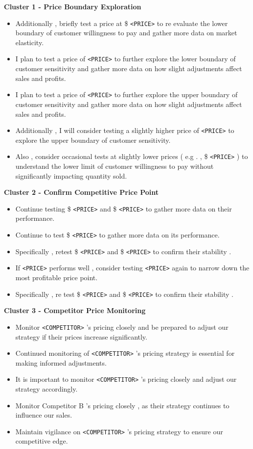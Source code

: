 \textbf{Cluster 1 - Price Boundary Exploration}
\begin{itemize}
    \item Additionally , briefly test a price at \$ \texttt{<PRICE>} to re evaluate the lower boundary of customer willingness to pay and gather more data on market elasticity.
    \item I plan to test a price of \texttt{<PRICE>} to further explore the lower boundary of customer sensitivity and gather more data on how slight adjustments affect sales and profits.
    \item I plan to test a price of \texttt{<PRICE>} to further explore the upper boundary of customer sensitivity and gather more data on how slight adjustments affect sales and profits.
    \item Additionally , I will consider testing a slightly higher price of \texttt{<PRICE>} to explore the upper boundary of customer sensitivity.
    \item Also , consider occasional tests at slightly lower prices ( e.g . , \$ \texttt{<PRICE>} ) to understand the lower limit of customer willingness to pay without significantly impacting quantity sold.
\end{itemize}

\textbf{Cluster 2 - Confirm Competitive Price Point}
\begin{itemize}
    \item Continue testing \$ \texttt{<PRICE>} and \$ \texttt{<PRICE>} to gather more data on their performance.
    \item Continue to test \$ \texttt{<PRICE>} to gather more data on its performance.
    \item Specifically , retest \$ \texttt{<PRICE>} and \$ \texttt{<PRICE>} to confirm their stability .
    \item If \texttt{<PRICE>} performs well , consider testing \texttt{<PRICE>} again to narrow down the most profitable price point.
    \item Specifically , re test \$ \texttt{<PRICE>} and \$ \texttt{<PRICE>} to confirm their stability .
\end{itemize}

\textbf{Cluster 3 - Competitor Price Monitoring}
\begin{itemize}
    \item Monitor \texttt{<COMPETITOR>} 's pricing closely and be prepared to adjust our strategy if their prices increase significantly.
    \item Continued monitoring of \texttt{<COMPETITOR>} 's pricing strategy is essential for making informed adjustments.
    \item It is important to monitor \texttt{<COMPETITOR>} 's pricing closely and adjust our strategy accordingly.
    \item Monitor Competitor B 's pricing closely , as their strategy continues to influence our sales.
    \item Maintain vigilance on \texttt{<COMPETITOR>} 's pricing strategy to ensure our competitive edge.
\end{itemize}

